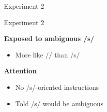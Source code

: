 \documentclass{beamer}
\begin{document}
\begin{frame}{Experiment 2}
\begin{minipage}{0.4\textwidth}
\end{minipage}

\end{frame}

\begin{frame}{Experiment 2}

\begin{minipage}{0.45\textwidth}
\textbf{Exposed to ambiguous /s/}
\begin{itemize}
\item More like /\textesh/ than /s/
\end{itemize}

\textbf{Attention}
\begin{itemize}
\item No /s/-oriented instructions
\item Told /s/ would be ambiguous
\end{itemize}


\end{minipage}
\end{frame}
\end{document}
